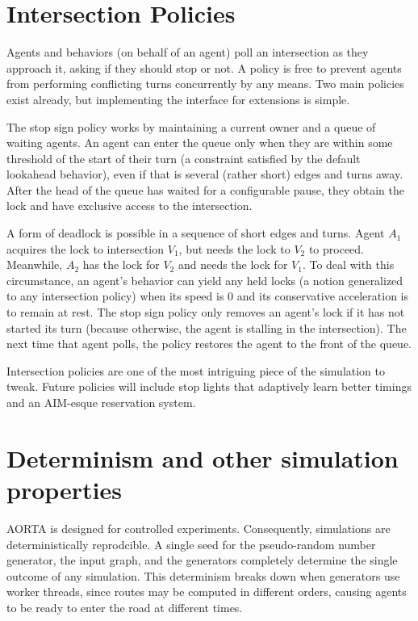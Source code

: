 \documentclass[letterpaper, 10 pt, conference]{ieeeconf}  %
\begin{document}
{\section{Intersection Policies}

Agents and behaviors (on behalf of an agent) poll an intersection as they
approach it, asking if they should stop or not. A policy is free to prevent
agents from performing conflicting turns concurrently by any means. Two main
policies exist already, but implementing the interface for extensions is simple.

The stop sign policy works by maintaining a current owner and a queue of waiting
agents. An agent can enter the queue only when they are within some threshold of
the start of their turn (a constraint satisfied by the default lookahead
behavior), even if that is several (rather short) edges and turns away. After
the head of the queue has waited for a configurable pause, they obtain the lock
and have exclusive access to the intersection.

A form of deadlock is possible in a sequence of short edges and turns. Agent
$A_1$ acquires the lock to intersection $V_1$, but needs the lock to $V_2$ to
proceed. Meanwhile, $A_2$ has the lock for $V_2$ and needs the lock for $V_1$.
To deal with this circumstance, an agent's behavior can yield any held locks (a
notion generalized to any intersection policy) when its speed is $0$ and its
conservative acceleration is to remain at rest. The stop sign policy only
removes an agent's lock if it has not started its turn (because otherwise, the
agent is stalling in the intersection). The next time that agent polls, the
policy restores the agent to the front of the queue.


Intersection policies are one of the most intriguing piece of the simulation to
tweak. Future policies will include stop lights that adaptively learn better
timings and an AIM-esque reservation system.

\section{Determinism and other simulation properties}

AORTA is designed for controlled experiments. Consequently, simulations are
deterministically reprodcible. A single seed for the pseudo-random number
generator, the input graph, and the generators completely determine the single
outcome of any simulation. This determinism breaks down when generators use
worker threads, since routes may be computed in different orders, causing agents
to be ready to enter the road at different times.

}
\end{document}
